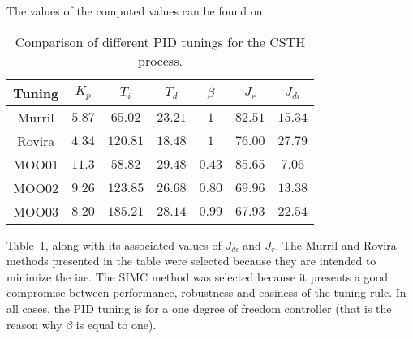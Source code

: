 The values of the computed values can be found on %
\begin{table}[tb]
	\centering
	\caption{Comparison of different PID tunings for the CSTH process.}
	\setlength{\tabcolsep}{8pt}
	\begin{tabular}{ccccccc}
		\toprule
		Tuning 	& $K_p$ 	& $T_i$		& $T_d$		& $\beta$	& $J_{r}$	& $J_{di}$\\
		\midrule
		Murril	& $5.87$	& $65.02$	& $23.21$	& $1$			& $82.51$	& $15.34$\\
		Rovira	& $4.34$	& $120.81$	& $18.48$	& $1$			& $76.00$	& $27.79$\\
		MOO01	& $11.3$	& $58.82$	& $29.48$	& $0.43$		& $85.65$	& $7.06$\\
		MOO02	& $9.26$	& $123.85$	& $26.68$	& $0.80$		& $69.96$	& $13.38$\\
		MOO03	& $8.20$	& $185.21$	& $28.14$	& $0.99$		& $67.93$	& $22.54$\\
		\bottomrule
	\end{tabular}
	\label{tab:CompPIDCSTH}
\end{table}
%
Table~\ref{tab:CompPIDCSTH}, along with its associated values of $J_{di}$ and $J_r$. The Murril and Rovira methods presented in the table were selected because they are intended to minimize the \gls{iae}. The SIMC method was selected because it presents a good compromise between performance, robustness and easiness of the tuning rule. In all cases, the PID tuning is for a one degree of freedom controller (that is  the reason why $\beta$ is equal to one).

